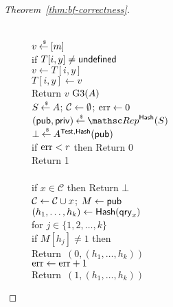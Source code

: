 \begin{proof}[Theorem~\ref{thm:bf-correctness}]
\begin{figure}[tp]
{{\\
$v {\:\stackrel{{\scriptscriptstyle \hspace{0.2em}\$}} {\leftarrow}\:} [m]$\\
if $T[i,y] \neq \mathsf{undefined}$\\
\nudge $v \gets T[i,y]$\\
$T[i,y] \gets v$\\
Return $v$
}
{
\underline{$\text{G3}(A)$}\\
$S {\:\stackrel{{\scriptscriptstyle \hspace{0.2em}\$}} {\leftarrow}\:} A$; ${\cal C} \gets \emptyset$; $\mathrm{err} \gets 0$\\
$(\pubaux,\privaux) \getsr \Rep^{\HashOracle}(S)$\\
$\bot {\:\stackrel{{\scriptscriptstyle \hspace{0.2em}\$}} {\leftarrow}\:} A^{\mathsf{Test},\mathsf{Hash}}({\sf pub})$\\
if $\mathrm{err}  < r$ then Return 0\\
Return 1\\ 

\\
if $x \in \mathcal{C}$ then Return $\bot$\\
${\cal C} \gets {\cal C} \cup x$; $M \gets{\sf pub}$\\
$(h_1, \ldots, h_{k}) \gets \mathsf{Hash}(\mathsf{qry}_x)$\\
for $j \in \{1,2,\ldots,k\}$\\
\nudge if $M[h_j] \neq 1$ then \\
\nudge \nudge Return~$(0, (h_1, \ldots, h_{k}) )$\\
$\mathrm{err} \gets \mathrm{err} +1$\\
Return~$(1, (h_1, \ldots, h_{k}) )$\\

}}
\end{figure}
\end{proof}

